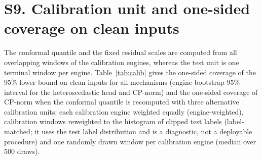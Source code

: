 \documentclass[10pt,a4paper]{article}
\begin{document}
\section*{S9. Calibration unit and one-sided coverage on clean inputs}
\noindent The conformal quantile and the fixed residual scales are computed from all overlapping windows of the calibration engines, whereas the test unit is one terminal window per engine. Table~\ref{tab:calib} gives the one-sided coverage of the 95\% lower bound on clean inputs for all mechanisms (engine-bootstrap 95\% interval for the heteroscedastic head and CP-norm) and the one-sided coverage of CP-norm when the conformal quantile is recomputed with three alternative calibration units: each calibration engine weighted equally (engine-weighted), calibration windows reweighted to the histogram of clipped test labels (label-matched; it uses the test label distribution and is a diagnostic, not a deployable procedure) and one randomly drawn window per calibration engine (median over 500 draws).
\begin{table}[H]\centering\scriptsize
\caption{One-sided coverage on clean inputs by mechanism and calibration unit (mean of five seeds).}\label{tab:calib}
\resizebox{\textwidth}{!}{}
\end{table}

\FloatBarrier
\end{document}
